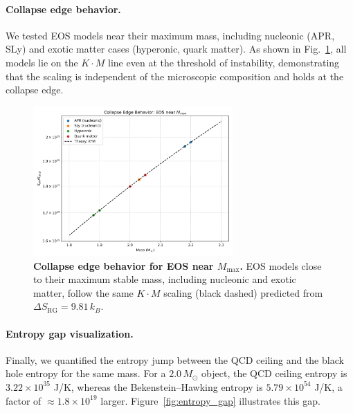 \documentclass[aps,prd,onecolumn,nofootinbib,superscriptaddress]{revtex4-2}
\begin{document}
\paragraph{Collapse edge behavior.}
We tested EOS models near their maximum mass, including nucleonic (APR, SLy) and exotic matter cases (hyperonic, quark matter). 
As shown in Fig.~\ref{fig:collapse_edge}, all models lie on the $K \cdot M$ line even at the threshold of instability, demonstrating that the scaling is independent of the microscopic composition and holds at the collapse edge.

\begin{figure}[htbp]
\centering
\includegraphics[width=0.68\textwidth]{figures/collapse_edge_test.png}
\caption{\textbf{Collapse edge behavior for EOS near $M_{\mathrm{max}}$.} 
EOS models close to their maximum stable mass, including nucleonic and exotic matter, follow the same $K \cdot M$ scaling (black dashed) predicted from $\Delta S_{\mathrm{RG}} = 9.81\,k_B$.}
\label{fig:collapse_edge}
\end{figure}

\paragraph{Entropy gap visualization.}
Finally, we quantified the entropy jump between the QCD ceiling and the black hole entropy for the same mass.
For a $2.0\,M_\odot$ object, the QCD ceiling entropy is $3.22\times 10^{35}$ J/K, whereas the Bekenstein--Hawking entropy is $5.79\times 10^{54}$ J/K, a factor of $\approx 1.8\times 10^{19}$ larger.
Figure~\ref{fig:entropy_gap} illustrates this gap.
\end{document}
